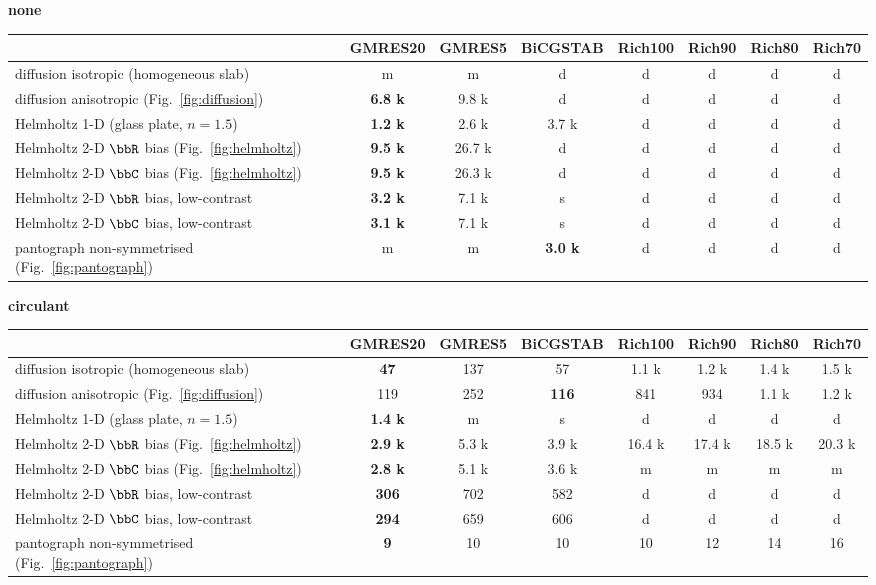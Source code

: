 


\textbf{none}\\
\begin{tabular}{l|c|c|c|c|c|c|c}& GMRES20& GMRES5& BiCGSTAB& Rich100& Rich90& Rich80& Rich70\\
\hline
diffusion isotropic (homogeneous slab)  & m & m & d & d & d & d & d\\
diffusion anisotropic (Fig.~\ref{fig:diffusion})  & \textbf{   6.8 k} &    9.8 k & d & d & d & d & d\\
Helmholtz 1-D (glass plate, $n=1.5$)  & \textbf{   1.2 k} &    2.6 k &    3.7 k & d & d & d & d\\
Helmholtz 2-D $\bbR$ bias (Fig.~\ref{fig:helmholtz})  & \textbf{   9.5 k} &   26.7 k & d & d & d & d & d\\
Helmholtz 2-D $\bbC$ bias (Fig.~\ref{fig:helmholtz})  & \textbf{   9.5 k} &   26.3 k & d & d & d & d & d\\
Helmholtz 2-D $\bbR$ bias, low-contrast  & \textbf{   3.2 k} &    7.1 k & s & d & d & d & d\\
Helmholtz 2-D $\bbC$ bias, low-contrast  & \textbf{   3.1 k} &    7.1 k & s & d & d & d & d\\
pantograph non-symmetrised (Fig.~\ref{fig:pantograph})  & m & m & \textbf{   3.0 k} & d & d & d & d\\
\end{tabular}

\textbf{circulant}\\
\begin{tabular}{l|c|c|c|c|c|c|c}& GMRES20& GMRES5& BiCGSTAB& Rich100& Rich90& Rich80& Rich70\\
\hline
diffusion isotropic (homogeneous slab)  & \textbf{47} & 137 & 57 &    1.1 k &    1.2 k &    1.4 k &    1.5 k\\
diffusion anisotropic (Fig.~\ref{fig:diffusion})  & 119 & 252 & \textbf{116} & 841 & 934 &    1.1 k &    1.2 k\\
Helmholtz 1-D (glass plate, $n=1.5$)  & \textbf{   1.4 k} & m & s & d & d & d & d\\
Helmholtz 2-D $\bbR$ bias (Fig.~\ref{fig:helmholtz})  & \textbf{   2.9 k} &    5.3 k &    3.9 k &   16.4 k &   17.4 k &   18.5 k &   20.3 k\\
Helmholtz 2-D $\bbC$ bias (Fig.~\ref{fig:helmholtz})  & \textbf{   2.8 k} &    5.1 k &    3.6 k & m & m & m & m\\
Helmholtz 2-D $\bbR$ bias, low-contrast  & \textbf{306} & 702 & 582 & d & d & d & d\\
Helmholtz 2-D $\bbC$ bias, low-contrast  & \textbf{294} & 659 & 606 & d & d & d & d\\
pantograph non-symmetrised (Fig.~\ref{fig:pantograph})  & \textbf{9} & 10 & 10 & 10 & 12 & 14 & 16\\
\end{tabular}


